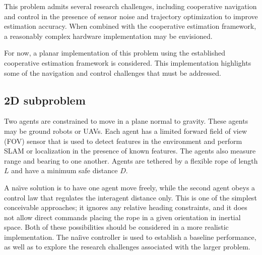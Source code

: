 \documentclass{aiaa-tc}
\begin{document}
This problem admits several research challenges, including cooperative navigation and control in the presence of sensor noise and trajectory optimization to improve estimation accuracy. When combined with the cooperative estimation framework, a reasonably complex hardware implementation may be envisioned.

For now, a planar implementation of this problem using the established cooperative estimation framework is considered. This implementation highlights some of the navigation and control challenges that must be addressed.

\subsection{2D subproblem}

Two agents are constrained to move in a plane normal to gravity. These agents may be ground robots or UAVs. Each agent has a limited forward field of view (FOV) sensor that is used to detect features in the environment and perform SLAM or localization in the presence of known features. The agents also measure range and bearing to one another. Agents are tethered by a flexible rope of length $L$ and have a minimum safe distance $D$.

A na\"{\i}ve solution is to have one agent move freely, while the second agent obeys a control law that regulates the interagent distance only. This is one of the simplest conceivable approaches; it ignores any relative heading constraints, and it does not allow direct commands placing the rope in a given orientation in inertial space. Both of these possibilities should be considered in a more realistic implementation. The nai\"{\i}ve controller is used to establish a baseline performance, as well as to explore the research challenges associated with the larger problem.
\end{document}
